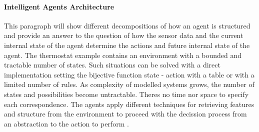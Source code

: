 \documentclass[11pt,oneside,a4paper,openright]{report}
\begin{document}

\paragraph{Intelligent Agents Architecture}

This paragraph will show different decompositions of how an agent is structured 
and provide an answer to the question of how the sensor data and the current internal 
state of the agent determine the actions and future internal state of the agent.
The thermostat example contains an environment with a bounded and tractable number of states.
Such situations can be solved with a direct implementation setting the bijective function 
state - action with a table or with a limited number of rules.
As complexity of modelled systems grows, the number of states and possibilities become
untractable. Theres no time nor space to specify each correspondence. The agents apply different 
techniques for retrieving features and structure from the environment to proceed with the
decission process from an abstraction to the action to perform \cite{RussellNorvig}.  
\end{document}
